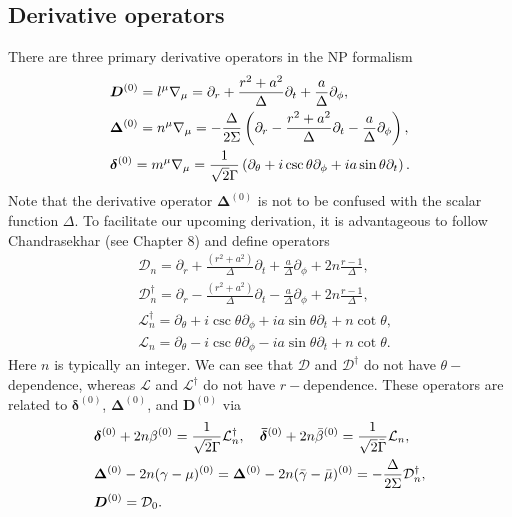 \documentclass[aps,prd,amsmath,floats,floatfix, twocolumn,
superscriptaddress,nofootinbib,showpacs]{revtex4-1}
\begin{document}
\subsection{Derivative operators}
There are three primary derivative operators in the NP formalism
\begin{align}
    &\bm{D}^{(0)}=l^\mu\nabla_\mu=\partial_r+\frac{r^2+a^2}{\Delta}\partial_t+\frac{a}{\Delta}\partial_\phi,\notag \\
    &\bm{\Delta}^{(0)}=n^\mu\nabla_\mu=-\frac{\Delta}{2\Sigma}\left(\partial_r-\frac{r^2+a^2}{\Delta}\partial_t-\frac{a}{\Delta}\partial_\phi\right),\notag \\
    &\bm{\delta}^{(0)}=m^\mu\nabla_\mu=\frac{1}{\sqrt{2}\Gamma}\left(\partial_\theta+i\csc\theta\partial_\phi+ia\sin\theta\partial_t\right). \notag 
\end{align}
Note that the derivative operator $\bm{\Delta}^{(0)}$ is not to be confused with the scalar function $\Delta$. To facilitate our upcoming derivation, it is advantageous to follow Chandrasekhar \cite{chandrasekhar1998mathematical} (see Chapter 8) and define operators
\begin{equation}
  \begin{aligned}
    &\mathcal{D}_n=\partial_r+\frac{(r^2+a^2)}{\Delta}\partial_t+\frac{a}{\Delta}\partial_\phi+2n\frac{r-1}{\Delta}, \\
    &\mathcal{D}_n^\dagger=\partial_r-\frac{(r^2+a^2)}{\Delta}\partial_t-\frac{a}{\Delta}\partial_\phi+2n\frac{r-1}{\Delta}, \\
    &\mathcal{L}_n^\dagger=\partial_\theta+ i\csc\theta\partial_\phi+ia \sin\theta\partial_t+n\cot\theta,\\
    &\mathcal{L}_n=\partial_\theta- i\csc\theta\partial_\phi-ia \sin\theta\partial_t+n\cot\theta.
\end{aligned}  
\end{equation}
Here $n$ is typically an integer. We can see that $\mathcal{D}$ and $\mathcal{D}^\dagger$ do not have $\theta-$dependence, whereas $\mathcal{L}$ and $\mathcal{L}^\dagger$ do not have $r-$dependence.  These operators are related to $\bm{\delta}^{(0)}$, $\bm{\Delta}^{(0)}$, and $\bm{D}^{(0)}$ via
\begin{align}
    &\bm{\delta}^{(0)} + 2n\beta^{(0)}  = \frac{1}{\sqrt{2}\Gamma}\mathcal{L}_n^\dagger, \quad \bm{\bar{\delta}}^{(0)} + 2n\bar{\beta}^{(0)}  = \frac{1}{\sqrt{2}\bar{\Gamma}}\mathcal{L}_n, \notag \\
    &
    \bm{\Delta}^{(0)}-2n(\gamma-\mu)^{(0)} = \bm{\Delta}^{(0)}-2n(\bar{\gamma}-\bar{\mu})^{(0)} = - \frac{\Delta}{2\Sigma} \mathcal{D}_n^\dagger, \notag \\
    & \bm{D}^{(0)}=\mathcal{D}_0. \label{eq:NR_der_op_Chan_op}
\end{align}
\end{document}
